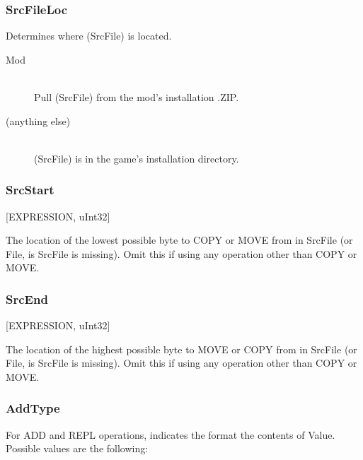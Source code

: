 \documentclass[12pt,a4paper,notitlepage]{article}
\begin{document}
\subsubsection{SrcFileLoc}
Determines where (SrcFile) is located.

\begin{description}
\item[Mod] \hfill \\ 
    Pull (SrcFile) from the mod's installation .ZIP.
\item[(anything else)] \hfill \\
    (SrcFile) is in the game's installation directory.
\end{description}

\subsubsection{SrcStart}
[EXPRESSION, uInt32]

The location of the lowest possible byte to COPY or MOVE from in SrcFile (or File, is SrcFile is missing). Omit this if using any operation other than COPY or MOVE.

\subsubsection{SrcEnd}
[EXPRESSION, uInt32]

The location of the highest possible byte to MOVE or COPY from in SrcFile (or File, is SrcFile is missing). Omit this if using any operation other than COPY or MOVE.

\subsubsection{AddType}
For ADD and REPL operations, indicates the format the contents of Value. Possible values are the following:
\end{document}
